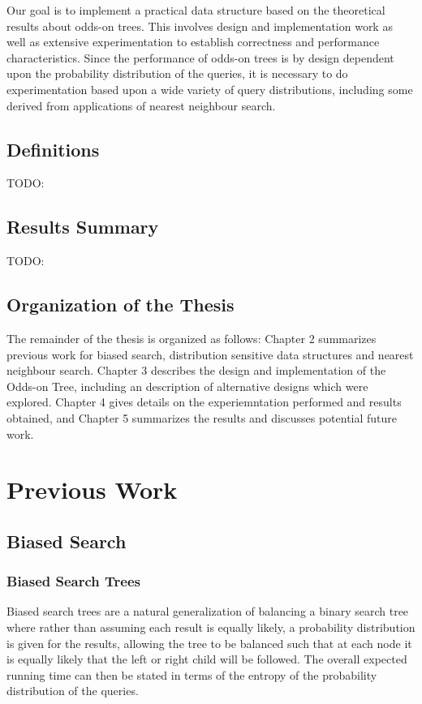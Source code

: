 \documentclass[mcs]{scsthesis}
\begin{document}
Our goal is to implement a practical data structure based on the theoretical
results about odds-on trees.  This involves design and implementation work as
well as extensive experimentation to establish correctness and performance
characteristics.  Since the performance of odds-on trees is by design
dependent upon the probability distribution of the queries, it is necessary
to do experimentation based upon a wide variety of query distributions,
including some derived from applications of nearest neighbour search.

\section{Definitions}

TODO:

\section{Results Summary}

TODO:

\section{Organization of the Thesis}

The remainder of the thesis is organized as follows: Chapter 2 summarizes
previous work for biased search, distribution sensitive data structures and
nearest neighbour search.  Chapter 3 describes the design and implementation of
the Odds-on Tree, including an description of alternative designs which were
explored.  Chapter 4 gives details on the experiemntation performed and results
obtained, and Chapter 5 summarizes the results and discusses potential 
future work.

\chapter{Previous Work}

\section{Biased Search}

\subsection{Biased Search Trees}

Biased search trees are a natural generalization of balancing a binary search
tree where rather than assuming each result is equally likely, a probability
distribution is given for the results, allowing the tree to be balanced such
that at each node it is equally likely that the left or right child will be
followed.  The overall expected running time can then be stated in terms of the
entropy of the probability distribution of the queries.
\end{document}
